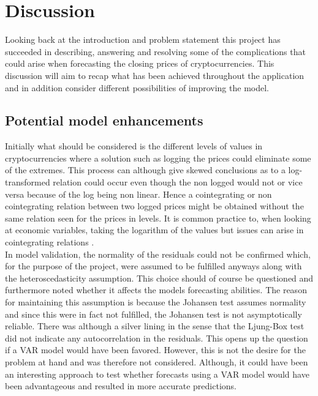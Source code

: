 \chapter{Discussion}
Looking back at the introduction and problem statement this project has succeeded in describing, answering and resolving some of the complications that could arise when forecasting the closing prices of cryptocurrencies. This discussion will aim to recap what has been achieved throughout the application and in addition consider different possibilities of improving the model.\\
\section{Potential model enhancements}
Initially what should be considered is the different levels of values in cryptocurrencies where a solution such as logging the prices could eliminate some of the extremes. This process can although give skewed conclusions as to a log-transformed relation could occur even though the non logged would not or vice versa because of the log being non linear. Hence a cointegrating or non cointegrating relation between two logged prices might be obtained without the same relation seen for the prices in levels. It is common practice to, when looking at economic variables, taking the logarithm of the values but issues can arise in cointegrating relations \cite{cointegrationloggedissues}.\\

\noindent In model validation, the normality of the residuals could not be confirmed which, for the purpose of the project, were assumed to be fulfilled anyways along with the heteroscedasticity assumption. This choice should of course be questioned and furthermore noted whether it affects the models forecasting abilities. The reason for maintaining this assumption is because the Johansen test assumes normality and since this were in fact not fulfilled, the Johansen test is not asymptotically reliable. There was although a silver lining in the sense that the Ljung-Box test did not indicate any autocorrelation in the residuals. This opens up the question if a VAR model would have been favored. However, this is not the desire for the problem at hand and was therefore not considered. Although, it could have been an interesting approach to test whether forecasts using a VAR model would have been advantageous and resulted in more accurate predictions.\\

